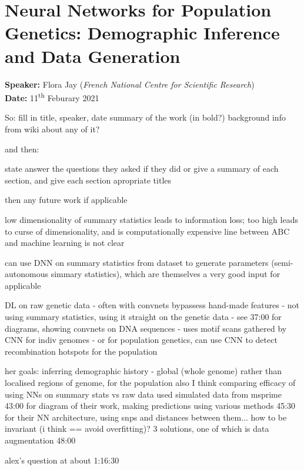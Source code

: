 \section{Neural Networks for Population Genetics: Demographic Inference and Data Generation}

\textbf{Speaker:} Flora Jay (\textit{French National Centre for Scientific Research})\\
\textbf{Date:} \hspace{.53cm} 11\textsuperscript{th} Feburary 2021
\vspace{.5cm}


So:
fill in title, speaker, date
summary of the work (in bold?)
background info from wiki about any of it?

and then:

state answer the questions they asked if they did
or give a summary of each section, and give each section apropriate titles

then any future work if applicable




low dimensionality of summary statistics leads to information loss; too high leads to curse of dimensionality, and is computationally expensive
line between ABC and machine learning is not clear

can use DNN on summary statistics from dataset to generate parameters (semi-autonomous simmary statistics), which are themselves a very good input for applicable

DL on raw genetic data - often with convnets bypassess hand-made features
                       - not using summary statistics, using it straight on the genetic data
                       - see 37:00 for diagrams, showing convnets on DNA sequences
                       - uses motif scans gathered by CNN for indiv genomes
                       - or for population genetics, can use CNN to detect recombination hotspots for the population 

her goals: inferring demographic history - global (whole genome) rather than localised regions of genome, for the population
           also I think comparing efficacy of using NNs on summary stats vs raw data
           used simulated data from msprime
           43:00 for diagram of their work, making predictions using various methods
           45:30 for their NN architecture, using snps and distances between them...
           how to be invariant (i think == avoid overfitting)? 3 solutions, one of which is data augmentation 48:00

alex's question at about 1:16:30
